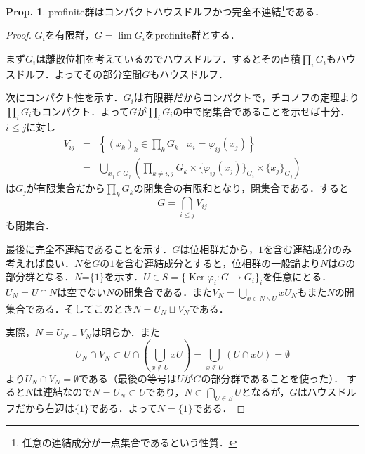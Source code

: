 \documentclass[dvipdfmx,b5paper,papersize]{jsarticle}
\theoremstyle{definition}
\newtheorem{prop}[thm]{Prop.}
\DeclareMathOperator{\Ker}{Ker}
\begin{document}
\begin{prop}\label{thm:property_of_profinite_topology}
  profinite群はコンパクトハウスドルフかつ完全不連結\footnote{任意の連結成分が一点集合であるという性質．}である．
\end{prop}
\begin{proof}
  $G_i$を有限群，$G=\lim G_i$をprofinite群とする．

  まず$G_i$は離散位相を考えているのでハウスドルフ．するとその直積$\prod_i G_i$もハウスドルフ．よってその部分空間$G$もハウスドルフ．

  次にコンパクト性を示す．$G_i$は有限群だからコンパクトで，チコノフの定理より$\prod_i G_i$もコンパクト．よって$G$が$\prod_i G_i$の中で閉集合であることを示せば十分．$i \leq j$に対し
  \begin{eqnarray*}
  V_{ij}&=&\left\{(x_k)_k \in \prod_k G_k \mid x_i = \varphi_{ij}(x_j)\right\}\\
  &=& \bigcup_{x_j \in G_j}\left(\prod_{k \neq i, j} G_k \times \{\varphi_{ij}(x_j)\}_{G_i} \times \{x_j\}_{G_j}\right)
  \end{eqnarray*}
  は$G_j$が有限集合だから$\prod_k G_k$の閉集合の有限和となり，閉集合である．すると
  \[
  G=\bigcap_{i \leq j} V_{ij}
  \]
  も閉集合．

  最後に完全不連結であることを示す．$G$は位相群だから，$1$を含む連結成分のみ考えれば良い．$N$を$G$の$1$を含む連結成分とすると，位相群の一般論より$N$は$G$の部分群となる．$N$=$\{1\}$を示す．$U \in S =\{ \Ker \varphi_i \colon G \to G_i\}_i$を任意にとる．$U_N =U\cap N$は空でない$N$の開集合である．また$V_N = \bigcup_{x \in N \backslash U} xU_N$もまた$N$の開集合である．そしてこのとき$N=U_N \sqcup V_N$である．

  実際，$N = U_N \cup V_N$は明らか．また
  \[
  U_N \cap V_N \subset U \cap \left(\bigcup_{x \notin U} xU\right) = \bigcup_{x \notin U} \left(U \cap xU\right) =\emptyset
  \]
  より$U_N \cap V_N = \emptyset$である（最後の等号は$U$が$G$の部分群であることを使った）．
  すると$N$は連結なので$N=U_N \subset U$であり，$N \subset \bigcap_{U \in S}U$となるが，$G$はハウスドルフだから右辺は$\{1\}$である．よって$N=\{1\}$である．
\end{proof}
\end{document}
